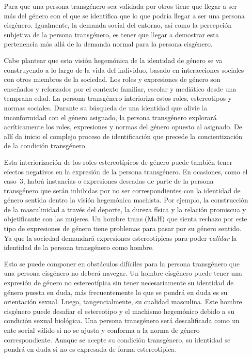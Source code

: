 Para que una persona transgénero sea validada por otros
tiene que llegar a ser más del género con el que se identifica que lo que podría
llegar a ser una persona cisgénero. Igualmente, la demanda social del entorno,
así como la percepción subjetiva de la persona transgénero, es tener que llegar
a demostrar esta pertenencia más allá de la demanda normal para la persona
cisgénero.

Cabe plantear que esta visión hegemónica de la identidad de género se va
construyendo a lo largo de la vida del individuo, basado en interacciones
sociales con otros miembros de la sociedad. Los roles y expresiones de género
son enseñados y reforzados por el contexto familiar, escolar y mediático desde
una temprana edad. La persona transgénero interioriza estos roles, estereotipos
y normas sociales. Durante su búsqueda de una identidad que alivie la
inconformidad con el género asignado, la persona transgénero explorará
acríticamente los roles, expresiones y normas del género opuesto al asignado. De
allí da inicio el complejo proceso de identificación que precede la
concientización de la condición transgénero.

Esta interiorización de los roles estereotípicos de género puede también tener
efectos negativos en la expresión de la persona transgénero. En ocasiones, como
el caso~3, habrá instancias o expresiones deseadas de parte de la persona
transgénero que serán inhibidas por no ser correspondientes con la identidad de
género sentida dentro la visión hegemónica machista. Por ejemplo, la
construcción de la masculinidad a través del deporte, la dureza física y la
relación promiscua y objetificante con las mujeres. Un hombre trans (MaH) que
sienta rechazo por este tipo de expresiones de género tiene problemas para pasar
por su género sentido. Ya que la sociedad demandará expresiones estereotípicas
para poder \emph{validar} la identidad de la persona transgénero como hombre.

Esto se puede componer en obstáculos difíciles para la persona transgénero que
una persona cisgénero no deberá navegar. Un hombre cisgénero puede tener una
expresión de género no estereotípica sin tener necesariamente su identidad de
género puesta en duda, más frecuentemente lo que se pondrá en duda es su
orientación sexual. Luego, tangencialmente, su cualidad masculina. Este hombre
cisgénero puede desafiar el estereotipo y el machismo hegemónico debido a su
condición sexual biológica. Una persona transgénero será descalificada como un
ente social válido si no se ajusta y conforma a la norma de género
correspondiente. Aunque se acepte su condición transgénero, su identidad se
pondrá en duda si no es expresada de forma estereotípica.


